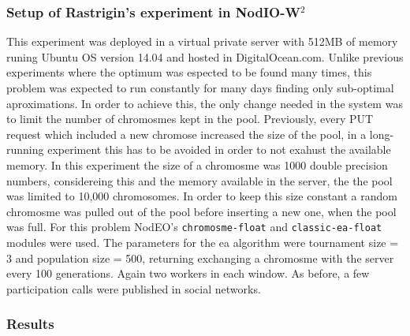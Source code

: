 \documentclass[journal,onecolumn]{IEEEtran}
\begin{document}
\subsubsection{Setup of Rastrigin's experiment in NodIO-W$^2$ }
This experiment was deployed in a virtual private server with 512MB of memory
runing Ubuntu OS version 14.04 and hosted in DigitalOcean.com. Unlike previous
experiments where the optimum was espected to be found many times, 
this problem was expected to run constantly for many days finding only
sub-optimal aproximations. In order to achieve this, the only change needed 
in the system was to limit the number of chromosmes kept in the pool. 
Previously, every PUT request which included a new chromose increased 
the size of the pool, in a long-running experiment this has to be avoided
in order to not exahust the available memory. In this experiment the size
of a chromosme was 1000 double precision numbers, considereing this
and the memory available in the server, the the pool was limited 
to 10,000 chromosomes.  In order to keep this size
constant a random chromosme was pulled out of the pool before inserting a
new one, when the pool was full. For this problem NodEO's {\tt chromosme-float} 
and {\tt classic-ea-float} modules were used. The parameters for the ea algorithm 
were tournament size = 3 and  population size = 500, returning exchanging a
chromosme with the server every 100 generations. Again two workers in each window.
As before, a few participation calls were published in social networks.

\subsubsection{Results}
\end{document}
